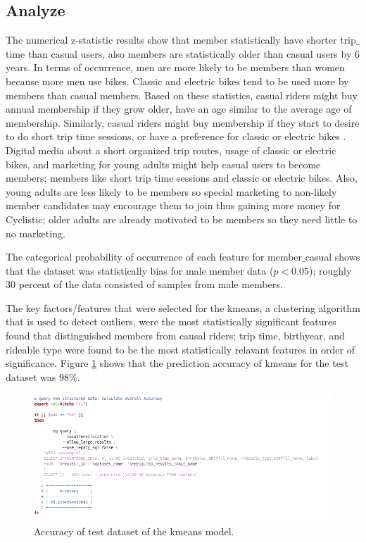 \documentclass[11pt, onecolumn]{article}
\begin{document}
\subsection{Analyze}
The numerical z-statistic results show that member statistically have shorter trip$\_$time than casual users, also members are statistically older than casual users by 6 years. In terms of occurrence, men are more likely to be members than women because more men use bikes. Classic and electric bikes tend to be used more by members than casual members. Based on these statistics, casual riders might buy annual membership if they grow older, have an age similar to the average age of membership. Similarly, casual riders might buy membership if they start to desire to do short trip time sessions, or have a preference for classic or electric bikes . Digital media about a short organized trip routes, usage of classic or electric bikes, and marketing for young adults might help casual users to become members; members like short trip time sessions and classic or electric bikes. Also, young adults are less likely to be members so special marketing to non-likely member candidates may encourage them to join thus gaining more money for Cyclistic; older adults are already motivated to be members so they need little to no marketing.

The categorical probability of occurrence of each feature for member$\_$casual shows that the dataset was statistically bias for male member data ($p < 0.05$); roughly 30 percent of the data consisted of samples from male members. 

The key factors/features that were selected for the kmeans, a  clustering algorithm that is used to detect outliers, were the most statistically significant features found that distinguished members from causal riders; trip time, birthyear, and rideable type were found to be the most statistically relavant features in order of significance. Figure \ref{accuracy_result} shows that the prediction accuracy of kmeans for the test dataset was 98\%.
\begin{figure}[h]
\begin{center}
\includegraphics[width=0.9\linewidth]{accuracy_result.png}
\end{center}
\caption{Accuracy of test dataset of the kmeans model.}
\label{accuracy_result}
\end{figure}
\end{document}
